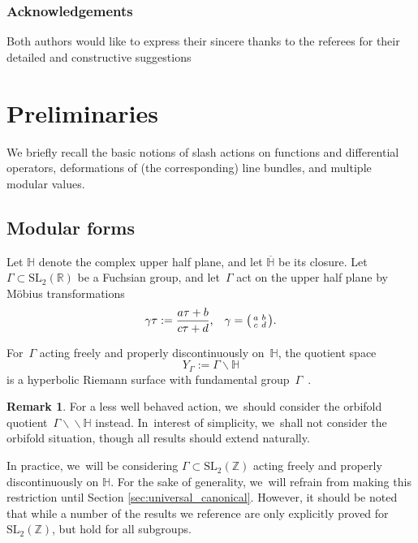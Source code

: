 \documentclass[JEP,XML,SOM,Unicode,published]{cedram}
\theoremstyle{plain}
\theoremstyle{definition}
\newtheorem{remark}[theoremcounter]{Remark}
\newcommand{\tx}{\text}
\newcommand{\bbR}{\ensuremath{\mathbb{R}}}
\newcommand{\bbZ}{\ensuremath{\mathbb{Z}}}
\let\ov\overline
\newenvironment{psmatrix}{\bigl(\begin{smallmatrix}}{\end{smallmatrix}\bigr)}
\newcommand{\SL}[1]{\ensuremath{\mathrm{SL}_{#1}}}
\newcommand{\HS}{\ensuremath{\mathbb{H}}}
\let\Ga\Gamma
\let\ga\gamma
\begin{document}
\subsubsection*{Acknowledgements}
Both authors would like to express their sincere thanks to the referees for their detailed and constructive suggestions

\section{Preliminaries}
\label{sec:preliminaries}

We briefly recall the basic notions of slash actions on functions and differential operators, deformations of (the corresponding) line bundles, and multiple modular values.

\subsection{Modular forms}
\label{ssec:modular_curves}

Let $\HS$ denote the complex upper half plane, and let $\ov{\HS}$ be its closure. Let~$\Ga\subset \SL2(\bbR)$ be a Fuchsian group, and let~$\Ga$ act on the upper half plane by Möbius transformations
\begin{equation*}
\gamma\tau
:=
\frac{a\tau +b}{c\tau + d}
\tx{,}\quad
\ga = \begin{psmatrix} a & b \\ c& d \end{psmatrix}
\tx{.}
\end{equation*}

For~$\Ga$ acting freely and properly discontinuously on~$\HS$, the quotient space
\begin{equation*}
Y_\Ga := \Ga\backslash\HS
\end{equation*}
is a hyperbolic Riemann surface with fundamental group~$\Ga$~\cite{Miyake1989}.

\begin{remark}
For a less well behaved action, we~should consider the orbifold quotient~$\Ga\backslash\!\!\backslash\HS$ instead. In~interest of simplicity, we~shall not consider the orbifold situation, though all results should extend naturally.

In practice, we~will be considering $\Ga\subset\SL2(\bbZ)$ acting freely and properly discontinuously on $\HS$. For the sake of generality, we~will refrain from making this restriction until Section \ref{sec:universal_canonical}. However, it should be noted that while a number of the results we reference are only explicitly proved for $\SL2(\bbZ)$, but hold for all subgroups.
\end{remark}
\end{document}
